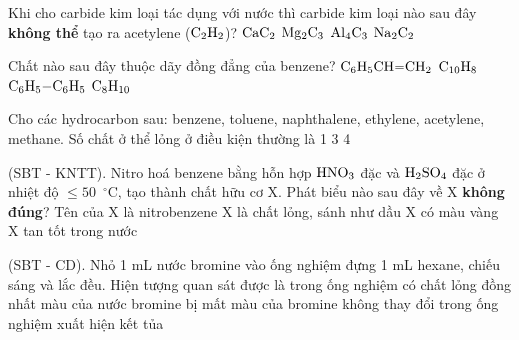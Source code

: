 \documentclass[12pt,a4paper]{article}
\begin{document}
\begin{ex}
Khi cho carbide kim loại tác dụng với nước thì carbide kim loại nào sau đây \textbf{không thể} tạo ra acetylene ($\ce{C2H2}$)?
\choice
{$\ce{CaC2}$}
{$\ce{Mg2C3}$}
{\True $\ce{Al4C3}$}
{$\ce{Na2C2}$}
\end{ex}

\begin{ex}
Chất nào sau đây thuộc dãy đồng đẳng của benzene?
\choice
{$\ce{C6H5CH=CH2}$}
{$\ce{C10H8}$}
{$\ce{C6H5-C6H5}$}
{\True $\ce{C8H10}$}
\end{ex}

\begin{ex}
Cho các hydrocarbon sau: benzene, toluene, naphthalene, ethylene, acetylene, methane. Số chất ở thể lỏng ở điều kiện thường là
\choice
{1}
{}
{3}
{4}
\end{ex}

\begin{ex}
(SBT - KNTT). Nitro hoá benzene bằng hỗn hợp $\ce{HNO3}$ đặc và $\ce{H2SO4}$ đặc ở nhiệt độ $\le 50$~$^\circ\text{C}$, tạo thành chất hữu cơ X. Phát biểu nào sau đây về X \textbf{không đúng}?
\choice
{Tên của X là nitrobenzene}
{X là chất lỏng, sánh như dầu}
{X có màu vàng}
{\True X tan tốt trong nước}
\end{ex}

\begin{ex}
(SBT - CD). Nhỏ 1 mL nước bromine vào ống nghiệm đựng 1 mL hexane, chiếu sáng và lắc đều. Hiện tượng quan sát được là
\choice
{trong ống nghiệm có chất lỏng đồng nhất}
{\True màu của nước bromine bị mất}
{màu của bromine không thay đổi}
{trong ống nghiệm xuất hiện kết tủa}
\end{ex}
\end{document}
